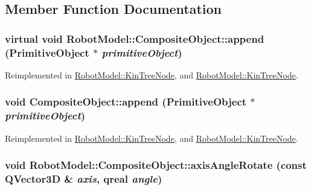 \subsection{Member Function Documentation}
\hypertarget{class_robot_model_1_1_composite_object_a8a54a80ac04249fdcc18f28aae52683c}{
\subsubsection[{append}]{\setlength{\rightskip}{0pt plus 5cm}virtual void RobotModel::CompositeObject::append ({\bf PrimitiveObject} $\ast$ {\em primitiveObject})}}
\label{class_robot_model_1_1_composite_object_a8a54a80ac04249fdcc18f28aae52683c}


Reimplemented in \hyperlink{class_robot_model_1_1_kin_tree_node_af043fc57074a449364d2a6ec09be46a3}{RobotModel::KinTreeNode}, and \hyperlink{class_robot_model_1_1_kin_tree_node_ae488de9b7fc97fb20690f66fead07391}{RobotModel::KinTreeNode}.\hypertarget{class_robot_model_1_1_composite_object_ad33452f1246939d366ffbf02d1022a91}{
\subsubsection[{append}]{\setlength{\rightskip}{0pt plus 5cm}void CompositeObject::append ({\bf PrimitiveObject} $\ast$ {\em primitiveObject})}}
\label{class_robot_model_1_1_composite_object_ad33452f1246939d366ffbf02d1022a91}


Reimplemented in \hyperlink{class_robot_model_1_1_kin_tree_node_af043fc57074a449364d2a6ec09be46a3}{RobotModel::KinTreeNode}, and \hyperlink{class_robot_model_1_1_kin_tree_node_ae488de9b7fc97fb20690f66fead07391}{RobotModel::KinTreeNode}.\hypertarget{class_robot_model_1_1_composite_object_aa59e7af66ca1a0ced127d8f2b30c7a6d}{
\subsubsection[{axisAngleRotate}]{\setlength{\rightskip}{0pt plus 5cm}void RobotModel::CompositeObject::axisAngleRotate (const QVector3D \& {\em axis}, \/  qreal {\em angle})}}
\label{class_robot_model_1_1_composite_object_aa59e7af66ca1a0ced127d8f2b30c7a6d}



